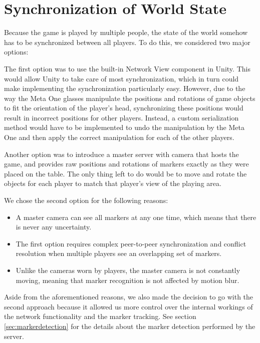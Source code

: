 	\section{Synchronization of World State} \label{sec:synchronization}
		Because the game is played by multiple people, the state of the world
        somehow has to be synchronized between all players. To do this, we 
        considered two major options:
        
        The first option was to use the built-in Network View component in 
        Unity. This would allow Unity to take care of most synchronization,
        which in turn could make implementing the synchronization particularly
        easy. However, due to the way the Meta One glasses manipulate the 
        positions and rotations of game objects to fit the orientation of the 
        player's head, synchronizing these positions would result in incorrect
        positions for other players. Instead, a custom serialization method 
        would have to be implemented to undo the manipulation by the Meta One
        and then apply the correct manipulation for each of the other players.

        Another option was to introduce a master server with camera that hosts
        the game, and provides raw positions and rotations of markers exactly as
        they were placed on the table. The only thing left to do would be to
        move and rotate the objects for each player to match that player's view
        of the playing area.

        We chose the second option for the following reasons:

        \begin{itemize}
        	\item A master camera can see all markers at any one time, which
        	means that there is never any uncertainty.
        	\item The first option requires complex peer-to-peer synchronization
        	and conflict resolution when multiple players see an overlapping set
        	of markers.
        	\item Unlike the cameras worn by players, the master camera is not
        	constantly moving, meaning that marker recognition is not affected
        	by motion blur.
        \end{itemize}
        
        Aside from the aforementioned reasons, we also made the decision to go
        with the second approach because it allowed us more control over the 
        internal workings of the network functionality and the marker tracking.
        See section \ref{sec:markerdetection} for the details about the marker
        detection performed by the server.
		
